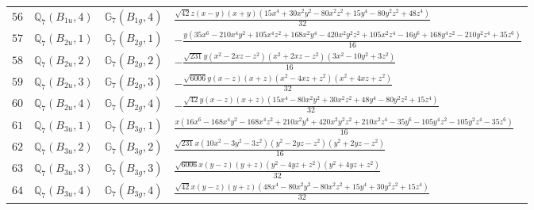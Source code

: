 \documentclass[fleqn,8pt,landscape]{jsarticle}
\begin{document}
\begin{table}[ht!]
\begin{center}
\begin{tabular}{cccl}
$ 56 $ & $ \mathbb{Q}_{7}(B_{1u},4) $ & $ \mathbb{G}_{7}(B_{1g},4) $ & $ \frac{\sqrt{42} z \left(x - y\right) \left(x + y\right) \left(15 x^{4} + 30 x^{2} y^{2} - 80 x^{2} z^{2} + 15 y^{4} - 80 y^{2} z^{2} + 48 z^{4}\right)}{32} $ \\
$ 57 $ & $ \mathbb{Q}_{7}(B_{2u},1) $ & $ \mathbb{G}_{7}(B_{2g},1) $ & $ - \frac{y \left(35 x^{6} - 210 x^{4} y^{2} + 105 x^{4} z^{2} + 168 x^{2} y^{4} - 420 x^{2} y^{2} z^{2} + 105 x^{2} z^{4} - 16 y^{6} + 168 y^{4} z^{2} - 210 y^{2} z^{4} + 35 z^{6}\right)}{16} $ \\
$ 58 $ & $ \mathbb{Q}_{7}(B_{2u},2) $ & $ \mathbb{G}_{7}(B_{2g},2) $ & $ - \frac{\sqrt{231} y \left(x^{2} - 2 x z - z^{2}\right) \left(x^{2} + 2 x z - z^{2}\right) \left(3 x^{2} - 10 y^{2} + 3 z^{2}\right)}{16} $ \\
$ 59 $ & $ \mathbb{Q}_{7}(B_{2u},3) $ & $ \mathbb{G}_{7}(B_{2g},3) $ & $ - \frac{\sqrt{6006} y \left(x - z\right) \left(x + z\right) \left(x^{2} - 4 x z + z^{2}\right) \left(x^{2} + 4 x z + z^{2}\right)}{32} $ \\
$ 60 $ & $ \mathbb{Q}_{7}(B_{2u},4) $ & $ \mathbb{G}_{7}(B_{2g},4) $ & $ - \frac{\sqrt{42} y \left(x - z\right) \left(x + z\right) \left(15 x^{4} - 80 x^{2} y^{2} + 30 x^{2} z^{2} + 48 y^{4} - 80 y^{2} z^{2} + 15 z^{4}\right)}{32} $ \\
$ 61 $ & $ \mathbb{Q}_{7}(B_{3u},1) $ & $ \mathbb{G}_{7}(B_{3g},1) $ & $ \frac{x \left(16 x^{6} - 168 x^{4} y^{2} - 168 x^{4} z^{2} + 210 x^{2} y^{4} + 420 x^{2} y^{2} z^{2} + 210 x^{2} z^{4} - 35 y^{6} - 105 y^{4} z^{2} - 105 y^{2} z^{4} - 35 z^{6}\right)}{16} $ \\
$ 62 $ & $ \mathbb{Q}_{7}(B_{3u},2) $ & $ \mathbb{G}_{7}(B_{3g},2) $ & $ \frac{\sqrt{231} x \left(10 x^{2} - 3 y^{2} - 3 z^{2}\right) \left(y^{2} - 2 y z - z^{2}\right) \left(y^{2} + 2 y z - z^{2}\right)}{16} $ \\
$ 63 $ & $ \mathbb{Q}_{7}(B_{3u},3) $ & $ \mathbb{G}_{7}(B_{3g},3) $ & $ \frac{\sqrt{6006} x \left(y - z\right) \left(y + z\right) \left(y^{2} - 4 y z + z^{2}\right) \left(y^{2} + 4 y z + z^{2}\right)}{32} $ \\
$ 64 $ & $ \mathbb{Q}_{7}(B_{3u},4) $ & $ \mathbb{G}_{7}(B_{3g},4) $ & $ \frac{\sqrt{42} x \left(y - z\right) \left(y + z\right) \left(48 x^{4} - 80 x^{2} y^{2} - 80 x^{2} z^{2} + 15 y^{4} + 30 y^{2} z^{2} + 15 z^{4}\right)}{32} $ \\
 \hline \hline
\end{tabular}
\end{center}
\end{table}
\end{document}
